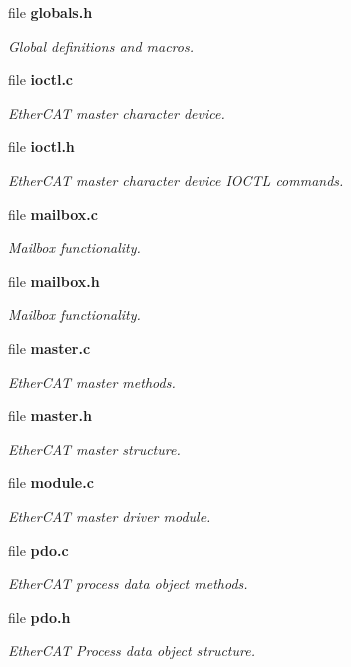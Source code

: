 \begin{DoxyCompactItemize}
file {\bf globals.\-h}
\begin{DoxyCompactList}\small\item\em Global definitions and macros. \end{DoxyCompactList}\item 
file {\bf ioctl.\-c}
\begin{DoxyCompactList}\small\item\em Ether\-C\-A\-T master character device. \end{DoxyCompactList}\item 
file {\bf ioctl.\-h}
\begin{DoxyCompactList}\small\item\em Ether\-C\-A\-T master character device I\-O\-C\-T\-L commands. \end{DoxyCompactList}\item 
file {\bf mailbox.\-c}
\begin{DoxyCompactList}\small\item\em Mailbox functionality. \end{DoxyCompactList}\item 
file {\bf mailbox.\-h}
\begin{DoxyCompactList}\small\item\em Mailbox functionality. \end{DoxyCompactList}\item 
file {\bf master.\-c}
\begin{DoxyCompactList}\small\item\em Ether\-C\-A\-T master methods. \end{DoxyCompactList}\item 
file {\bf master.\-h}
\begin{DoxyCompactList}\small\item\em Ether\-C\-A\-T master structure. \end{DoxyCompactList}\item 
file {\bf module.\-c}
\begin{DoxyCompactList}\small\item\em Ether\-C\-A\-T master driver module. \end{DoxyCompactList}\item 
file {\bf pdo.\-c}
\begin{DoxyCompactList}\small\item\em Ether\-C\-A\-T process data object methods. \end{DoxyCompactList}\item 
file {\bf pdo.\-h}
\begin{DoxyCompactList}\small\item\em Ether\-C\-A\-T Process data object structure. \end{DoxyCompactList}\item 

\end{DoxyCompactItemize}
